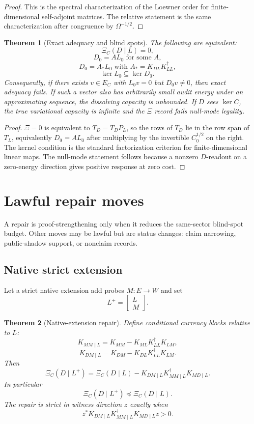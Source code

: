 \documentclass[11pt]{article}
\newtheorem{theorem}{Theorem}
\begin{document}
\begin{proof}
This is the spectral characterization of the Loewner order for finite-dimensional self-adjoint matrices.  The relative statement is the same characterization after congruence by $\Omega^{-1/2}$.
\end{proof}

\begin{theorem}[Exact adequacy and blind spots]
The following are equivalent:
\[
\Xi_C(D\mid L)=0,
\]
\[
D_0=A L_0\text{ for some }A,
\]
\[
D_0=A_*L_0\text{ with }A_*=K_{DL}K_{LL}^{\dagger},
\]
\[
\boxed{\ker L_0\subseteq\ker D_0.}
\]
Consequently, if there exists $v\in E_C$ with $L_0v=0$ but $D_0v\ne0$, then exact adequacy fails.  If such a vector also has arbitrarily small audit energy under an approximating sequence, the dissolving capacity is unbounded.  If $D$ sees $\ker C$, the true variational capacity is infinite and the $\Xi$ record fails null-mode legality.
\end{theorem}

\begin{proof}
$\Xi=0$ is equivalent to $T_D=T_DP_L$, so the rows of $T_D$ lie in the row span of $T_L$, equivalently $D_0=A L_0$ after multiplying by the invertible $C_0^{1/2}$ on the right.  The kernel condition is the standard factorization criterion for finite-dimensional linear maps.  The null-mode statement follows because a nonzero $D$-readout on a zero-energy direction gives positive response at zero cost.
\end{proof}

\section{Lawful repair moves}
A repair is proof-strengthening only when it reduces the same-sector blind-spot budget.  Other moves may be lawful but are status changes: claim narrowing, public-shadow support, or nonclaim records.

\subsection{Native strict extension}
Let a strict native extension add probes $M:E\to W$ and set
\[
L^+=\begin{bmatrix}L\\ M\end{bmatrix}.
\]

\begin{theorem}[Native-extension repair]
Define conditional currency blocks relative to $L$:
\[
K_{MM\mid L}=K_{MM}-K_{ML}K_{LL}^{\dagger}K_{LM},
\]
\[
K_{DM\mid L}=K_{DM}-K_{DL}K_{LL}^{\dagger}K_{LM}.
\]
Then
\[
\boxed{\Xi_C(D\mid L^+)=\Xi_C(D\mid L)-K_{DM\mid L}K_{MM\mid L}^{\dagger}K_{MD\mid L}.}
\]
In particular
\[
\Xi_C(D\mid L^+)\preceq\Xi_C(D\mid L).
\]
The repair is strict in witness direction $z$ exactly when
\[
z^*K_{DM\mid L}K_{MM\mid L}^{\dagger}K_{MD\mid L}z>0.
\]
\end{theorem}
\end{document}
